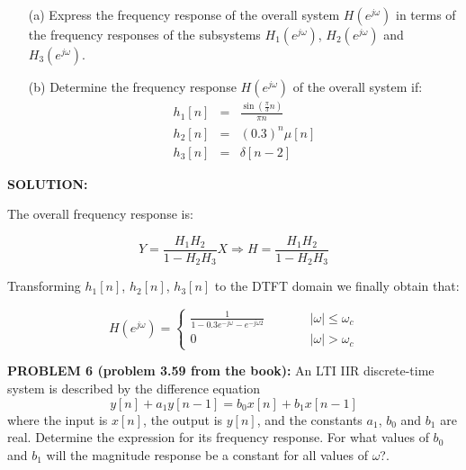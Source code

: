 \documentclass[a4paper,11pt,oneside]{article}
\begin{document}
\begin{itemize}
\item[(a)] Express the frequency response of the overall system $H(e^{j\omega})$ in terms of the frequency responses of the subsystems $H_1(e^{j\omega})$, $H_2(e^{j\omega})$ and $H_3(e^{j\omega})$.
\item[(b)] Determine the frequency response $H(e^{j\omega})$ of the overall system if:
\[
\begin{array}{lll}
h_1[n] &=& \frac{\sin(\frac{\pi}{3}n)}{\pi n}\\
h_2[n] &=&(0.3)^{n}\mu[n]\\
h_3[n] &=&\delta[n-2]
\end{array}
\]
\end{itemize}


\vspace{1cm}
 
\textbf{SOLUTION:}

The overall frequency response is:

\[
Y = \frac{H_1H_2}{1-H_2H_3}X \Rightarrow H=\frac{H_1H_2}{1-H_2H_3}
\]

Transforming $h_1[n]$, $h_2[n]$, $h_3[n]$ to the DTFT domain we finally obtain that:

\[
H(e^{j\omega}) = \left\{
\begin{array}{lll}
\frac{1}{1-0.3e^{-j\omega}-e^{-j\omega 2}}&\qquad& |\omega|\leq\omega_c\\
0 &\qquad&|\omega|>\omega_c
\end{array}
\right.
\]


\vspace{1cm}




\textbf{PROBLEM 6 (problem 3.59 from the book):} An LTI IIR discrete-time system is described by the difference equation
\[
y[n] + a_1y[n-1] = b_0x[n]+b_1x[n-1]
\]
where the input is $x[n]$, the output is $y[n]$, and the constants $a_1$, $b_0$ and $b_1$ are real. Determine the expression for its frequency response. For what values of $b_0$ and $b_1$ will the magnitude response be a constant for all values of $\omega$?.




\vspace{1cm}
\end{document}
